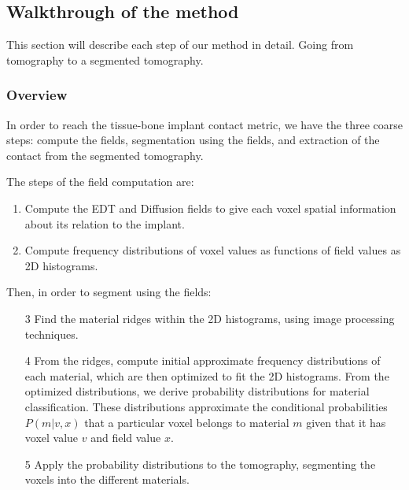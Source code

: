 
\subsection{Walkthrough of the method}
This section will describe each step of our method in detail. Going from tomography to a segmented tomography.

\subsubsection{Overview}
In order to reach the tissue-bone implant contact metric, we have the three coarse steps: compute the fields, segmentation using the fields, and extraction of the contact from the segmented tomography.

The steps of the field computation are:
\begin{enumerate}
    \item Compute the EDT and Diffusion fields to give each voxel spatial information about its relation to the implant.
    \item Compute frequency distributions of voxel values as functions of field values as 2D histograms.
\end{enumerate}
    
Then, in order to segment using the fields:
\begin{enumerate}
    \item[3] Find the material ridges within the 2D histograms, using image processing techniques.
    \item[4] From the ridges, compute initial approximate frequency distributions of each material, which are then optimized to fit the 2D histograms.
          From the optimized distributions, we derive probability distributions for material classification. These distributions approximate the conditional probabilities $P(m|v,x)$ that a particular voxel belongs to material $m$ given that it has voxel value $v$ and field value $x$.
    \item[5] Apply the probability distributions to the tomography, segmenting the voxels into the different materials.
\end{enumerate}
    
